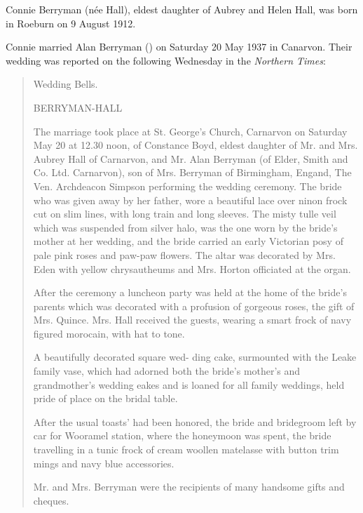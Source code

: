 
Connie Berryman (n\'{e}e Hall), eldest daughter of Aubrey and Helen Hall, was born in Roeburn on 9 August 1912.\cite{ConnieBirthNotice}

Connie married Alan Berryman () on Saturday 20 May 1937 in Canarvon. Their wedding was reported on the following Wednesday in the \emph{Northern Times}:\cite{ConnieWedding}

\begin{quotation}
Wedding Bells.

BERRYMAN-HALL

The marriage took place at St. George's Church, Carnarvon on Saturday May 20 at 12.30 noon, of Constance Boyd, eldest daughter of Mr. and Mrs. Aubrey Hall of Carnarvon, and Mr. Alan Berryman (of Elder, Smith and Co. Ltd. Carnarvon), son of Mrs. Berryman of Birmingham, Engand, The Ven. Archdeacon Simpson performing the wedding ceremony. The bride who was given away by her father, wore a beautiful lace over ninon frock cut on slim lines, with long train and long sleeves. The misty tulle veil which was suspended from silver halo, was the one worn by the bride's mother at her wedding, and the bride carried an early Victorian posy of pale pink roses and paw-paw flowers. The altar was decorated by Mrs. Eden with yellow chrysautheums and Mrs. Horton officiated at the organ.

After the ceremony a luncheon party was held at the home of the bride's parents which was decorated with a     profusion of gorgeous roses, the gift of Mrs. Quince. Mrs. Hall received the guests, wearing a smart frock of navy figured morocain, with hat to tone.

A beautifully decorated square wed- ding cake, surmounted with the Leake family vase, which had adorned both the bride's mother's and grandmother's wedding eakes and is loaned for all family weddings, held pride of place on the bridal table.

After the usual toasts' had been honored, the bride and bridegroom left by car for Wooramel station, where the honeymoon was spent, the bride travelling in a tunic frock of cream woollen matelasse with button trim mings and navy blue accessories.

Mr. and Mrs. Berryman were the recipients of many handsome gifts and cheques.
\end{quotation}

